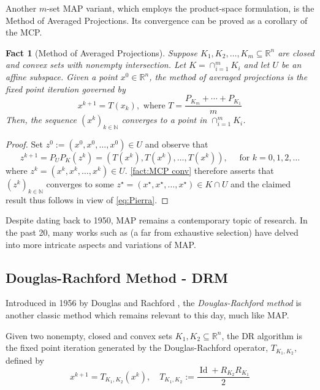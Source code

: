 \documentclass[smallextended,numbook,nospthms]{svjour3}
\theoremstyle{plain}
\newtheorem{fact}[theorem]{Fact}
\theoremstyle{definition}
\def\RR{\mathds R}
\def\NN{\mathds N}
\DeclareMathOperator{\Id}{Id}
\begin{document}
Another $m$-set MAP variant, which employs the product-space formulation, is the Method of Averaged Projections. Its convergence can be proved as a corollary of the MCP.

\begin{fact}[Method of Averaged Projections]\label{fact:MAvgP}
	Suppose $K_{1}, K_{2}, \ldots, K_{m} \subseteq \RR^n$ are closed and convex sets with nonempty intersection. Let $K = \cap_{i=1}^{m} K_{i}$ and let $U$ be an affine subspace. Given a point $x^{0} \in \RR^n$, the method of averaged projections is the fixed point iteration governed by
	$$
	x^{k+1}=T\left(x_{k}\right), \text { where } T=\frac{P_{K_{m}}+\cdots+P_{K_{1}}}{m}
	$$
	Then, the sequence $\left(x^{k}\right)_{k \in \NN}$ converges to a point in $\cap_{i=1}^{m} K_{i}$.
\end{fact}
\begin{proof}
	Set $z^{0}:=\left(x^{0}, x^{0}, \ldots, x^{0}\right) \in U$ and observe that
	$$
	z^{k+1}=P_{U} P_{K}\left(z^{k}\right)=\left(T\left(x^{k}\right), T\left(x^{k}\right), \ldots, T\left(x^{k}\right)\right), \quad \text { for } k=0,1,2, \ldots
	$$
	where $z^{k}=\left(x^{k}, x^{k}, \ldots, x^{k}\right) \in U$. \cref{fact:MCP conv} therefore asserts that $\left(z^{k}\right)_{k \in \NN}$ converges to some $z^{\star}=\left(x^{\star}, x^{\star}, \ldots, x^{\star}\right) \in K \cap U$ and the claimed result thus follows in view of \cref{eq:Pierra}.	
\end{proof}

Despite dating back to 1950, MAP remains a contemporary topic of research. In the past 20, many works such as \cite{Badea:2012cg,Bauschke:2003,Bauschke:2009, Bauschke:2013, Bauschke:2013jb, Bauschke:2016, Behling:2020a, Bui:2020, Cegielski:2008bd, Diaconis:2010,Drusvyatskiy:2015,Drusvyatskiy:2016ft,Drusvyatskiy:2018,Escalante:2011,HernandezRamos:2011gf,Hesse:2014,Hundal:2004,Kopecka:2004,Kopecka:2010,Kopecka:2011,Kopecka:2012,Kruger:2015wq,Lewis:2009,Tam:2012vp} (a far from exhaustive selection) have delved into more intricate aspects and variations of MAP.

\subsection{Douglas-Rachford Method - DRM}\label{subsec:DRM}
Introduced in 1956 by Douglas and Rachford \cite{Douglas:1956kk}, the \emph{Douglas-Rachford method} is another classic method which remains relevant to this day, much like MAP.

Given two nonempty, closed and convex sets $K_1, K_2 \subseteq \RR^n$, the DR algorithm is the fixed point iteration generated by the Douglas-Rachford operator, $T_{K_1, K_2}$, defined by
\[
x^{k+1}=T_{K_1, K_2}\left(x^{k}\right), \quad T_{K_1, K_2}:=\frac{\Id+R_{K_2} R_{K_1}}{2} \label{eq:DRM}
\]
\end{document}
